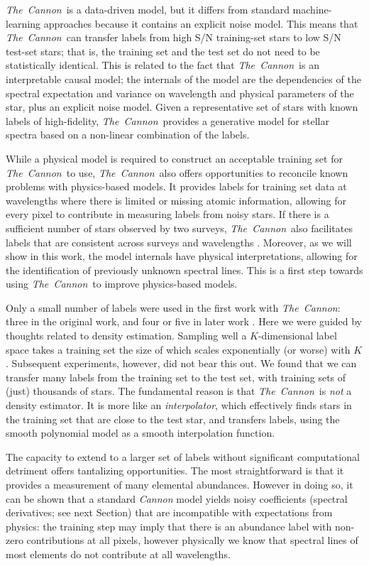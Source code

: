 \documentclass[12pt,preprint]{aastex}
\newcommand{\project}[1]{\textsl{#1}}
\newcommand{\TheCannon}{\project{The~Cannon}}
\begin{document}
  \TheCannon\ is a data-driven model, 
but it differs from standard machine-learning approaches because it contains an 
explicit noise model.  This means that \TheCannon\ can transfer labels from high
S/N training-set stars to low S/N test-set stars; that is, the training set and
the test set do not need to be statistically identical.  This is related to the
fact that \TheCannon\ is an interpretable causal model; the internals of the model are 
the dependencies of the spectral expectation and variance on wavelength and 
physical parameters of the star, plus an explicit noise model.  Given a representative set of stars with known
labels of high-fidelity, \TheCannon\ provides a generative model for stellar 
spectra based on a non-linear combination of the labels.  



While a physical model is required to construct an acceptable training set for
\TheCannon\ to use, \TheCannon\ also offers opportunities to reconcile known problems with physics-based 
models.  It provides labels for training set data at wavelengths where there is
limited or missing atomic information, allowing for every pixel to contribute in 
measuring labels from noisy stars.  If there is a sufficient
number of stars observed by two surveys, \TheCannon\ also facilitates labels that
are consistent across surveys and wavelengths \citep{Ho_2016}.  Moreover, as we
will show in this work, the model internals have physical interpretations, 
allowing for the identification of previously unknown spectral lines.  This is
a first step towards using \TheCannon\ to improve physics-based models.


Only a small number of labels were used in the first work with \TheCannon: 
three in the original work, and four or five in later work \citep{tc, age, Ho_2016}. 
Here we were guided by thoughts related to density estimation. Sampling well a 
$K$-dimensional label space takes a training set the size of which scales 
exponentially (or worse) with $K$.  Subsequent experiments, however, did not 
bear this out.  We found that we can transfer many labels from the training set 
to the test set, with training sets of (just) thousands of stars.  The fundamental 
reason is that \TheCannon\ is \emph{not} a density estimator.  It is more like 
an \emph{interpolator}, which effectively finds stars in the training set that
are close to the test star, and transfers labels, using the smooth polynomial 
model as a smooth interpolation function.


The capacity to extend to a larger set of labels without significant
computational detriment offers tantalizing opportunities.  The most 
straightforward is that it provides a measurement of many elemental abundances.
However in doing so, it can be shown that a standard \emph{Cannon} model yields
noisy coefficients (spectral derivatives; see next Section) that are incompatible with 
expectations from physics: the training step may imply that there is an abundance label with non-zero 
contributions at all pixels, however physically we know that spectral lines of most
elements do not contribute at all wavelengths. 
\end{document}

